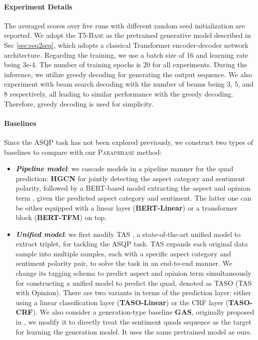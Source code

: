 \documentclass[11pt]{article}
\begin{document}
\paragraph{Experiment Details}
The averaged scores over five runs with different random seed initialization are reported.
We adopt the \textsc{T5-Base} \cite{t5-paper} as the pretrained generative model described in Sec \ref{sec:seq2seq}, which adopts a classical Transformer encoder-decoder network architecture.
Regarding the training, we use a batch size of 16 and learning rate being 3e-4. The number of training epochs is 20 for all experiments. 
During the inference, we utilize greedy decoding for generating the output sequence. We also experiment with beam search decoding with the number of beams being 3, 5, and 8 respectively, all leading to similar performance with the greedy decoding. Therefore, greedy decoding is used for simplicity.


\paragraph{Baselines}
Since the ASQP task has not been explored previously, we construct two types of baselines to compare with our \textsc{Paraphrase} method:
\begin{itemize}[leftmargin=*]
    \setlength{\itemsep}{0pt}
    \setlength{\parsep}{0pt}
    \setlength{\parskip}{0pt}
    
    \item \textbf{\textit{Pipeline model}}: we cascade models in a pipeline manner for the quad prediction: \textbf{HGCN} \cite{coling20-acsa} for jointly detecting the aspect category and sentiment polarity, followed by a BERT-based model extracting the aspect and opinion term \cite{wnut19-absa-bert}, given the predicted aspect category and sentiment. The latter one can be either equipped with a linear layer (\textbf{BERT-Linear}) or a transformer block (\textbf{BERT-TFM}) on top.
    
    \item \textbf{\textit{Unified model}}: we first modify TAS \cite{aaai20-tasd}, a state-of-the-art unified model to extract  triplet, for tackling the ASQP task.
    TAS expands each original data sample into multiple samples, each with a specific aspect category and sentiment polarity pair, to solve the task in an end-to-end manner.
    We change its tagging schema to predict aspect and opinion term simultaneously for constructing a unified model to predict the quad, denoted as TASO (TAS with Opinion). There are two variants in terms of the prediction layer: either using a linear classification layer (\textbf{TASO-Linear}) or the CRF layer (\textbf{TASO-CRF}).
    We also consider a generation-type baseline \textbf{GAS}, originally proposed in \cite{acl21-gabsa}, we modify it to directly treat the sentiment quads sequence as the target for learning the generation model. It uses the same pretrained model as ours. 
\end{itemize}
\end{document}
